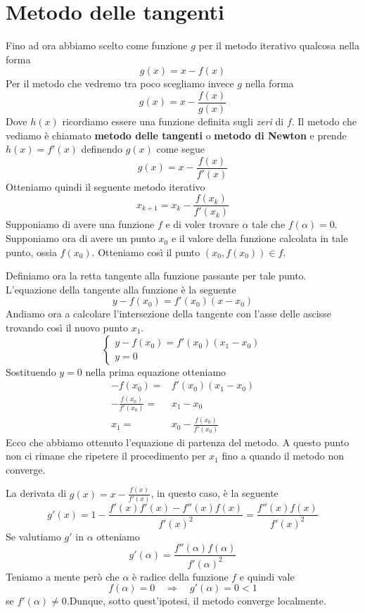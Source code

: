 \section{Metodo delle tangenti}
Fino ad ora abbiamo scelto come funzione $g$ per il metodo iterativo qualcosa nella forma
\[ g(x) = x - f(x) \]
Per il metodo che vedremo tra poco scegliamo invece $g$ nella forma
\[ g(x) = x - \frac{f(x)}{g(x)} \]
Dove $h(x)$ ricordiamo essere una funzione definita sugli \emph{zeri} di $f$. Il metodo che vediamo è chiamato
\textbf{metodo delle tangenti} o \textbf{metodo di Newton} e prende $h(x) = f'(x)$ definendo $g(x)$ come segue
\[ g(x) = x - \frac{f(x)}{f'(x)} \]
Otteniamo quindi il seguente metodo iterativo
\[ x_{k+1} = x_k - \frac{f(x_k)}{f'(x_k)} \]
Supponiamo di avere una funzione $f$ e di voler trovare $\alpha$ tale che $f(\alpha) = 0$. Supponiamo ora di
avere un punto $x_0$ e il valore della funzione calcolata in tale punto, ossia $f(x_0)$. Otteniamo così il
punto $(x_0, f(x_0)) \in f$.

Definiamo ora la retta tangente alla funzione passante per tale punto. L'equazione della tangente alla funzione
è la seguente
\[ y - f(x_0) = f'(x_0)(x - x_0) \]
Andiamo ora a calcolare l'intersezione della tangente con l'asse delle ascisse trovando così il nuovo punto $x_1$.
\[
	\begin{cases}
		y - f(x_0) = f'(x_0)(x_1 - x_0) \\
		y = 0
	\end{cases}
\]
Sostituendo $y = 0$ nella prima equazione otteniamo
\begin{align*}
	-f(x_0) =                 & f'(x_0)(x_1 - x_0)           \\
	-\frac{f(x_0)}{f'(x_0)} = & x_1 - x_0                    \\
	x_1 =                     & x_0 - \frac{f(x_0)}{f'(x_0)}
\end{align*}
Ecco che abbiamo ottenuto l'equazione di partenza del metodo. A questo punto non ci rimane che ripetere il
procedimento per $x_1$ fino a quando il metodo non converge.

La derivata di $g(x) = x - \frac{f(x)}{f'(x)}$, in questo caso, è la seguente
\[ g'(x) = 1 - \frac{f'(x) f'(x) - f''(x) f(x)}{f'(x)^2} = \frac{f''(x) f(x)}{f'(x)^2} \]
Se valutiamo $g'$ in $\alpha$ otteniamo
\[ g'(\alpha) = \frac{f''(\alpha) f(\alpha)}{f'(\alpha)^2} \]
Teniamo a mente però che $\alpha$ è radice della funzione $f$ e quindi vale
\[ f(\alpha) = 0 \quad \Rightarrow \quad g'(\alpha) = 0 < 1 \]
se $f'(\alpha) \neq 0$.Dunque, sotto quest'ipotesi, il metodo converge localmente.


